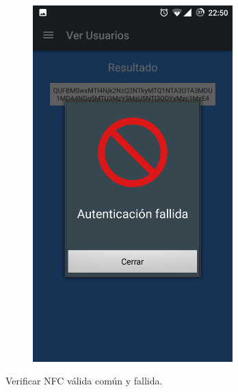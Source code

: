 \documentclass[../PFC.tex]{subfiles}
\begin{document}
\begin{figure}[H]
\begin{subfigure}{0.4\textwidth}
       \includegraphics[width=0.850\textwidth]{./img/app/validacionFallida}
    \end{subfigure}   
  \caption{Verificar NFC válida común y fallida.}
  \label{img:app:verificarNFC1}
\end{figure}
\end{document}
